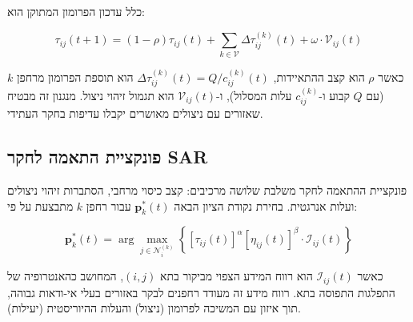 כלל עדכון הפרומון המתוקן הוא:

\begin{equation}
\tau_{ij}(t+1) = (1-\rho)\tau_{ij}(t) + \sum_{k \in \mathcal{V}} \Delta\tau_{ij}^{(k)}(t) + \omega \cdot \mathcal{V}_{ij}(t)
\label{eq:modified_pheromone_ch02}
\end{equation}

כאשר $\rho$ הוא קצב ההתאיידות, $\Delta\tau_{ij}^{(k)}(t) = Q / c_{ij}^{(k)}(t)$ הוא תוספת הפרומון מרחפן $k$ (עם $Q$ קבוע ו-$c_{ij}^{(k)}$ עלות המסלול), ו-$\mathcal{V}_{ij}(t)$ הוא תגמול זיהוי ניצול. מנגנון זה מבטיח שאזורים עם ניצולים מאושרים יקבלו עדיפות בחקר העתידי.

\subsection{פונקציית התאמה לחקר SAR}
\label{sec:fitness_function}

פונקציית ההתאמה לחקר  משלבת שלושה מרכיבים: קצב כיסוי מרחבי, הסתברות זיהוי ניצולים ועלות אנרגטית. בחירת נקודת הציון הבאה $\mathbf{p}_{k}^{*}(t)$ עבור רחפן $k$ מתבצעת על פי:

\begin{equation}
\mathbf{p}_{k}^{*}(t) = \arg\max_{j \in \mathcal{N}_{i}^{(k)}} \left\{ [\tau_{ij}(t)]^{\alpha}[\eta_{ij}(t)]^{\beta} \cdot \mathcal{I}_{ij}(t) \right\}
\label{eq:waypoint_selection}
\end{equation}

כאשר $\mathcal{I}_{ij}(t)$ הוא רווח המידע הצפוי מביקור בתא $(i,j)$, המחושב כהאנטרופיה של התפלגות התפוסה בתא. רווח מידע זה מעודד רחפנים לבקר באזורים בעלי אי-ודאות גבוהה, תוך איזון עם המשיכה לפרומון (ניצול) והעלות ההיוריסטית (יעילות).

\begin{table}[htbp]
\centering
\caption{פרמטרי  והשפעתם על ביצועי החקר.}
\label{tab:ch02_aco_params}
\end{table}

